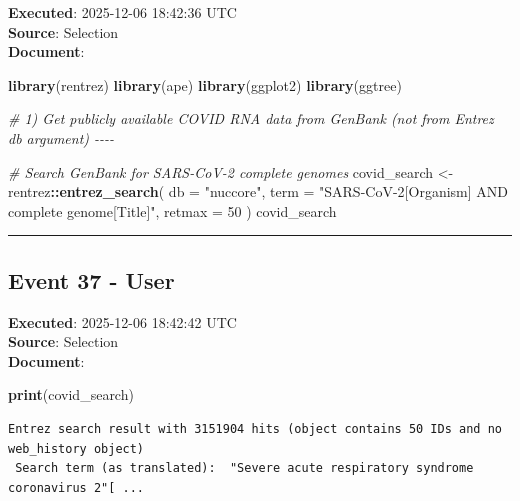\documentclass[
  11pt,
]{article}
\newenvironment{Shaded}{\begin{snugshade}}{\end{snugshade}}
\newcommand{\AttributeTok}[1]{\textcolor[rgb]{0.13,0.29,0.53}{#1}}
\newcommand{\CommentTok}[1]{\textcolor[rgb]{0.56,0.35,0.01}{\textit{#1}}}
\newcommand{\DecValTok}[1]{\textcolor[rgb]{0.00,0.00,0.81}{#1}}
\newcommand{\FunctionTok}[1]{\textcolor[rgb]{0.13,0.29,0.53}{\textbf{#1}}}
\newcommand{\NormalTok}[1]{#1}
\newcommand{\OtherTok}[1]{\textcolor[rgb]{0.56,0.35,0.01}{#1}}
\newcommand{\SpecialCharTok}[1]{\textcolor[rgb]{0.81,0.36,0.00}{\textbf{#1}}}
\newcommand{\StringTok}[1]{\textcolor[rgb]{0.31,0.60,0.02}{#1}}
\newenvironment{rpoutput}{\vspace{0.5em}\begin{snugshade}}{\end{snugshade}}
\begin{document}
\textbf{Executed}: 2025-12-06 18:42:36 UTC\\
\textbf{Source}: Selection\\
\textbf{Document}:

\begin{Shaded}
\begin{Highlighting}[]
\FunctionTok{library}\NormalTok{(rentrez)}
\FunctionTok{library}\NormalTok{(ape)}
\FunctionTok{library}\NormalTok{(ggplot2)}
\FunctionTok{library}\NormalTok{(ggtree)}

\CommentTok{\# 1) Get publicly available COVID RNA data from GenBank (not from Entrez db argument) {-}{-}{-}{-}}

\CommentTok{\# Search GenBank for SARS{-}CoV{-}2 complete genomes}
\NormalTok{covid\_search }\OtherTok{\textless{}{-}}\NormalTok{ rentrez}\SpecialCharTok{::}\FunctionTok{entrez\_search}\NormalTok{(}
  \AttributeTok{db =} \StringTok{"nuccore"}\NormalTok{,}
  \AttributeTok{term =} \StringTok{"SARS{-}CoV{-}2[Organism] AND complete genome[Title]"}\NormalTok{,}
  \AttributeTok{retmax =} \DecValTok{50}
\NormalTok{)}
\NormalTok{covid\_search}
\end{Highlighting}
\end{Shaded}

\begin{center}\rule{0.5\linewidth}{0.5pt}\end{center}

\subsection{Event 37 - User}\label{event-37---user}

\textbf{Executed}: 2025-12-06 18:42:42 UTC\\
\textbf{Source}: Selection\\
\textbf{Document}:

\begin{Shaded}
\begin{Highlighting}[]
\FunctionTok{print}\NormalTok{(covid\_search)}
\end{Highlighting}
\end{Shaded}

\begin{rpoutput}

\begin{verbatim}
Entrez search result with 3151904 hits (object contains 50 IDs and no web_history object)
 Search term (as translated):  "Severe acute respiratory syndrome coronavirus 2"[ ... 
\end{verbatim}

\end{rpoutput}
\end{document}
